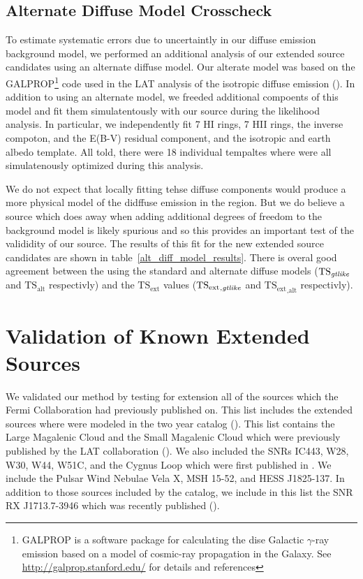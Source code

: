\documentclass[12pt,preprint]{aastex}
\newcommand{\tsext}{{\ensuremath{\text{TS}_\text{ext}}}\xspace}
\newcommand{\tsextgtlike}{\ensuremath{\tsext_{,\gtlike}}\xspace}
\newcommand{\tsextalt}{\ensuremath{\tsext_{,\alt}}\xspace}
\newcommand{\ts}{\text{TS}\xspace}
\newcommand{\alt}{\text{alt}\xspace}
\newcommand{\gtlike}{\text{\em gtlike}\xspace}
\begin{document}
\subsection{Alternate Diffuse Model Crosscheck}
\label{alt_diff_model_description}

To estimate systematic errors due to uncertaintly in our diffuse
emission background model, we performed an additional analysis
of our extended source candidates using an alternate diffuse
model. Our alterate model was based on the GALPROP\footnote{GALPROP
is a software package for calculating the dise Galactic $\gamma$-ray
emission based on a model of cosmic-ray propagation in the Galaxy. See
\url{http://galprop.stanford.edu/} for details and references} code
used in the LAT analysis of the isotropic diffuse emission
(\cite{isotropic_lat}).  In addition to using an alternate model, we
freeded additional compoents of this model and fit them simulatentously
with our source during the likelihood analysis. In particular,
we independently fit 7 HI rings, 7 HII rings, the inverse compoton,
and the E(B-V) residual component, and the isotropic and earth albedo
template. All told, there were 18 individual tempaltes where were all
simulatenously optimized during this analysis.

We do not expect that locally fitting tehse diffuse components would
produce a more physical model of the didffuse emission in the region.
But we do believe a source which does away when adding additional
degrees of freedom to the background model is likely spurious and so
this provides an important test of the valididity of our source.
The results of this fit for the new extended source candidates are
shown in table~\ref{alt_diff_model_results}. There is overal
good agreement between the \ts using the standard and alternate diffuse
models ($\ts_\gtlike$ and $\ts_\alt$ respectivly) and the \tsext values
(\tsextgtlike and \tsextalt respectivly).



\section{Validation of Known Extended Sources}
\label{validate_known}

We validated our method by testing for extension all of the sources
which the Fermi Collaboration had previously published on.  This list
includes the extended sources where were modeled in the two year catalog
(\cite{second_cat}).  This list contains the Large Magalenic Cloud
and the Small Magalenic Cloud which were previously published by the
LAT collaboration (\cite{lmc,smc}).  We also included the SNRs IC443, W28, W30, W44, W51C, and the Cygnus Loop which
were first published in \cite{ic443,w28,w30,w44,w51c,cygnus_loop}.
We include the Pulsar Wind Nebulae Vela X, MSH 15-52, and HESS
J1825-137\cite{velax,msh1552,fermi_hess_j1825}.  In addition to those
sources included by the catalog, we include in this list the SNR RX J1713.7-3946 which was recently published (\cite{RXJ1713}).
\end{document}
